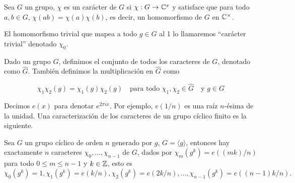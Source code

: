 \begin{definition}
Sea $G$ un grupo, $\chi$ es un carácter de $G$ si $\chi: G\to \mathbb{C}^{x}$ y satisface que para todo $a,b\in G$, $\chi(ab)=\chi(a)\chi(b)$, es decir, un homomorfismo de $G$ en $\mathbb{C}^{\times}$.
\end{definition}

 El homomorfismo trivial que mapea a todo $g\in G$ al 1 lo llamaremos ``carácter trivial'' denotado $\chi_0$.\\

 \begin{definition}
 Dado un grupo $G$, definimos el conjunto de todos los caracteres de $G$, denotado como $\widehat{G}$. También definimos la multiplicación en $\widehat{G}$ como

$$\chi_1\chi_2(g)=\chi_1(g)\chi_2(g) \quad \text{para todo } \chi_1,\chi_2\in \widehat{G} \quad \text{y } g\in G$$

 \end{definition}

Decimos $e(x)$ para denotar $e^{2 \pi i x}$. Por ejemplo, $e(1 / n)$ es una raíz $n$-ésima de la unidad. Una caracterización de los caracteres de un grupo cíclico finito es la siguiente.

\begin{theorem}
Sea $G$ un grupo cíclico de orden $n$ generado por $g$, $G=\langle g\rangle$, entonces hay exactamente $n$ caracteres $\chi_0,\ldots,\chi_{n-1}$ de $G$, dados por $\chi_m(g^k)=e\left((mk)/n\right)$ para todo $0\leq m\leq n-1$ y $k\in \mathbb{Z}$, esto es 
$$\chi_0(g^k)=1, \chi_1(g^k)=e(k/n),\chi_2(g^k)=e(2k/n),\ldots,\chi_{n-1}(g^k)=e((n-1)k/n).$$
\end{theorem}

